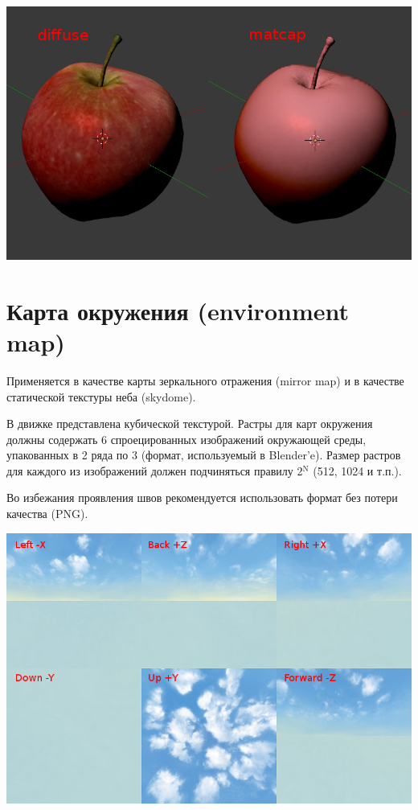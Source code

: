 \documentclass[a4paper,12pt,oneside]{sphinxmanual}
\begin{document}
\begin{DUlineblock}{0em}
\item[] 
\end{DUlineblock}

{\hfill\includegraphics[width=1.000\linewidth]{stencil_apple_separate_textures.jpg}\hfill}

\begin{DUlineblock}{0em}
\item[] 
\end{DUlineblock}


\section{Карта окружения (environment map)}
\label{textures:environment-map}\label{textures:index-10}
Применяется в качестве карты зеркального отражения (mirror map) и в качестве статической текстуры неба (skydome).

В движке представлена кубической текстурой. Растры для карт окружения должны содержать 6 спроецированных изображений окружающей среды, упакованных в 2 ряда по 3 (формат, используемый в Blender'e). Размер растров для каждого из изображений должен подчиняться правилу 2$^{\text{N}}$ (512, 1024 и т.п.).

Во избежания проявления швов рекомендуется использовать формат без потери качества (PNG).

{\hfill\includegraphics[width=1.000\linewidth]{environment_map.png}\hfill}
\end{document}

